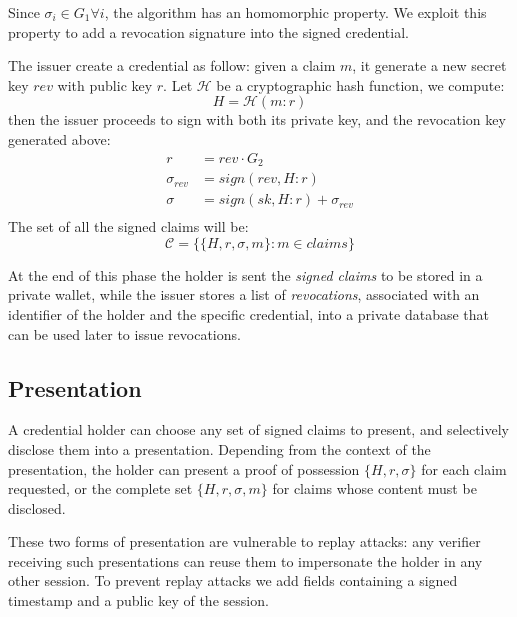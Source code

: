 Since $\sigma_i\in G_1 \forall i$, the algorithm has an homomorphic
property. We exploit this property to add a revocation signature into
the signed credential.

The issuer create a credential as follow: given a claim $m$, it
generate a new secret key $rev$ with public key $r$. Let $\mathcal{H}$
be a cryptographic hash function, we compute:
\begin{equation*}
    H = \mathcal{H}(m : r)
\end{equation*}
then the issuer proceeds to sign with both its private key, and the
revocation key generated above:
\begin{equation*}\label{rev_agg}
    \begin{split}
        r &= rev \cdot G_2 \\
        \sigma_{rev} &= sign(rev, H : r)\\
        \sigma &= sign(sk, H : r) + \sigma_{rev}\\
   \end{split}
\end{equation*}
The set of all the signed claims will be:
\begin{equation*}
   \mathcal{C} = \big\{ \{H, r, \sigma, m \} : m\in claims  \big\}
\end{equation*}

At the end of this phase the holder is sent the \textit{signed claims}
to be stored in a private wallet, while the issuer stores a list of
\textit{revocations}, associated with an identifier of the holder and
the specific credential, into a private database that can be used
later to issue revocations.



\subsection{Presentation} \label{presentation}

A credential holder can choose any set of signed claims to present,
and selectively disclose them into a presentation. Depending from the
context of the presentation, the holder can present a proof of
possession $\{ H, r, \sigma \}$ for each claim requested, or the
complete set $\{ H, r, \sigma, m \}$ for claims whose content must be
disclosed.

These two forms of presentation are vulnerable to replay attacks: any
verifier receiving such presentations can reuse them to impersonate
the holder in any other session. To prevent replay attacks we add
fields containing a signed timestamp and a public key of the session.

